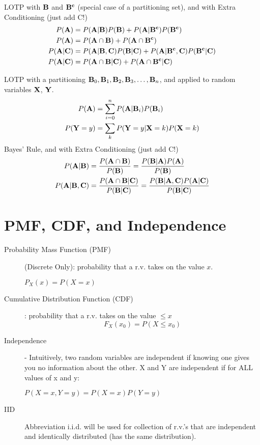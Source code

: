 \documentclass[11pt]{article}
\theoremstyle{definition}
\theoremstyle{remark}
\begin{document}
LOTP with ${\bf B}$ and ${\bf B^c}$ (special case of a partitioning set), and with Extra Conditioning (just add C!)
   \begin{align*} 
P({\bf A}) &= P({\bf A} | {\bf B})P({\bf B}) + P({\bf A} | {\bf B^c})P({\bf B^c}) \\
P({\bf A}) &= P({\bf A} \cap {\bf B})+ P({\bf A} \cap {\bf B^c}) \\
P({\bf A} | {\bf C}) &= P({\bf A} | {\bf B}, {\bf C})P({\bf B} | {\bf C}) + P({\bf A} | {\bf B^c}, {\bf C})P({\bf B^c} | {\bf C}) \\
P({\bf A} | {\bf C}) &= P({\bf A} \cap {\bf B} | {\bf C})+ P({\bf A} \cap {\bf B^c} | {\bf C})
   \end{align*} 

\noindent
LOTP with a partitioning ${\bf B}_0, {\bf B}_1, {\bf B}_2, {\bf B}_3, \dots, {\bf B}_n$, and applied to random variables ${\bf X}$, ${\bf Y}$.
\begin{align*} 
P({\bf A}) &= \sum_{i=0}^n P({\bf A} | {\bf B}_i)P({\bf B}_i) \\
P({\bf Y}=y) &= \sum_{k}P({\bf Y}=y|{\bf X}=k)P({\bf X}=k)
   \end{align*} 
Bayes' Rule, and with Extra Conditioning (just add C!)
	\begin{align*}
		 P({\bf A}|{\bf B}) &= \frac{P({\bf A} \cap {\bf B})}{P({\bf B})} = \frac{P({\bf B}|{\bf A})P({\bf A})}{P({\bf B})} \\
		 P({\bf A}|{\bf B}, {\bf C}) &= \frac{P({\bf A} \cap {\bf B} | {\bf C})}{P({\bf B} | {\bf C})} = \frac{P({\bf B}|{\bf A}, {\bf C})P({\bf A} | {\bf C})}{P({\bf B} | {\bf C})} 
	\end{align*}
	
\section{PMF, CDF, and Independence}
\begin{description}

\item[Probability Mass Function (PMF)] (Discrete Only): probability that a r.v. takes on the value $x$.
\begin{center}
$P_X(x) = P(X=x)$
\end{center}


\item[Cumulative Distribution Function (CDF)]: probability that a r.v. takes on the value $\leq x$
\[F_X(x_0) = P(X \leq x_0)\]

\item[Independence] - Intuitively, two random variables are independent if knowing one gives you no information about the other. X and Y are independent if for ALL values of x and y:  \begin{center}
$P(X=x, Y=y) = P(X = x)P(Y = y)$
\end{center}

\item[IID] Abbreviation i.i.d. will be used for collection of r.v.'s that are independent and identically distributed (has the same distribution).

\end{description}
\end{document}
